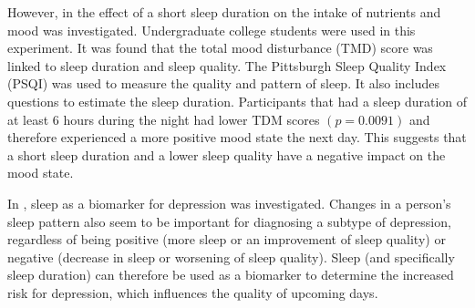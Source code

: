 However, in \cite{rehagen2015short} the effect of a short sleep duration on the intake of nutrients and mood was investigated.
Undergraduate college students were used in this experiment.
It was found that the total mood disturbance (TMD) score was linked to sleep duration and sleep quality. 
The Pittsburgh Sleep Quality Index (PSQI) was used to measure the quality and pattern of sleep. 
It also includes questions to estimate the sleep duration.
Participants that had a sleep duration of at least 6 hours during the night had lower TDM scores $(p = 0.0091)$ and therefore experienced a more positive mood state the next day.
This suggests that a short sleep duration and a lower sleep quality have a negative impact on the mood state.

In \cite{wichniak2013sleep}, sleep as a biomarker for depression was investigated.
Changes in a person's sleep pattern also seem to be important for diagnosing a subtype of depression, regardless of being positive (more sleep or an improvement of sleep quality) or negative (decrease in sleep or worsening of sleep quality).
Sleep (and specifically sleep duration) can therefore be used as a biomarker to determine the increased risk for depression, which influences the quality of upcoming days.